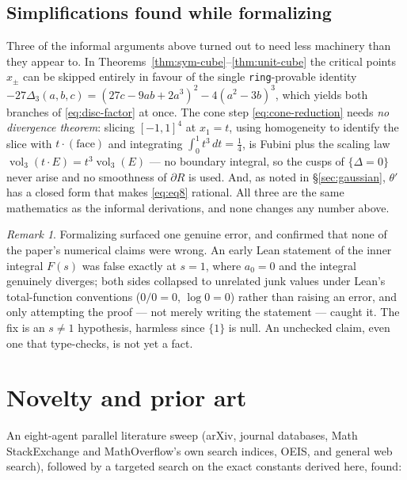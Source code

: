 \documentclass[11pt,reqno]{amsart}
\theoremstyle{plain}
\theoremstyle{remark}
\newtheorem{remark}[theorem]{Remark}
\DeclareMathOperator{\vol}{vol}
\newcommand{\disc}{\Delta}
\begin{document}
\subsection*{Simplifications found while formalizing}
Three of the informal arguments above turned out to need less machinery than
they appear to. In Theorems~\ref{thm:sym-cube}--\ref{thm:unit-cube} the
critical points $x_\pm$ can be skipped entirely in favour of the single
\texttt{ring}-provable identity
$-27\disc_3(a,b,c)=(27c-9ab+2a^3)^2-4(a^2-3b)^3$, which yields both branches
of \eqref{eq:disc-factor} at once. The cone step \eqref{eq:cone-reduction}
needs \emph{no divergence theorem}: slicing $[-1,1]^4$ at $x_1=t$, using
homogeneity to identify the slice with $t\cdot(\text{face})$ and integrating
$\int_0^1t^3\,dt=\tfrac14$, is Fubini plus the scaling law
$\vol_3(t\cdot E)=t^3\vol_3(E)$ --- no boundary integral, so the cusps of
$\{\disc=0\}$ never arise and no smoothness of $\partial R$ is used. And, as
noted in \S\ref{sec:gaussian}, $\theta'$ has a closed form that makes
\eqref{eq:eq8} rational. All three are the same mathematics as the informal
derivations, and none changes any number above.

\begin{remark}
Formalizing surfaced one genuine error, and confirmed that none of the
paper's numerical claims were wrong. An early Lean statement of the inner
integral $F(s)$ was false exactly at $s=1$, where $a_0=0$ and the integral
genuinely diverges; both sides collapsed to unrelated junk values under
Lean's total-function conventions ($0/0=0$, $\log0=0$) rather than raising an
error, and only attempting the proof --- not merely writing the statement ---
caught it. The fix is an $s\ne1$ hypothesis, harmless since $\{1\}$ is null.
An unchecked claim, even one that type-checks, is not yet a fact.
\end{remark}

\section{Novelty and prior art} \label{sec:novelty}

An eight-agent parallel literature sweep (arXiv, journal databases, Math
StackExchange and MathOverflow's own search indices, OEIS, and general web
search), followed by a targeted search on the exact constants derived here,
found:
\end{document}
